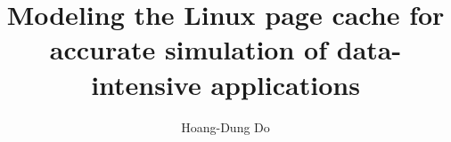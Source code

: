 \author{Hoang-Dung Do}
\title{Modeling the Linux page cache for accurate simulation of data-intensive applications}

